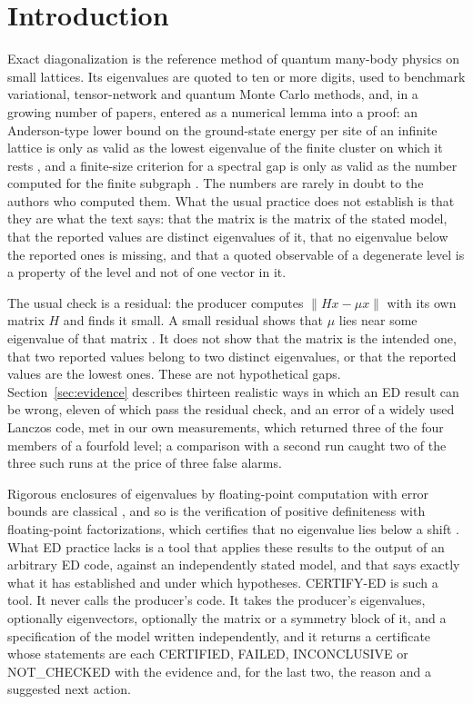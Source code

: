 \documentclass[11pt,a4paper]{article}
\newcommand{\status}[1]{\textsf{#1}}
\newcommand{\CERT}{\status{CERTIFIED}}
\newcommand{\FAIL}{\status{FAILED}}
\newcommand{\INC}{\status{INCONCLUSIVE}}
\newcommand{\NC}{\status{NOT\_CHECKED}}
\newcommand{\norm}[1]{\lVert #1\rVert}
\begin{document}
\tableofcontents

\section{Introduction}
\label{sec:intro}

Exact diagonalization is the reference method of quantum many-body physics on small lattices. Its eigenvalues are
quoted to ten or more digits, used to benchmark variational, tensor-network and quantum Monte Carlo methods, and, in a
growing number of papers, entered as a numerical lemma into a proof: an Anderson-type lower bound on the ground-state
energy per site of an infinite lattice is only as valid as the lowest eigenvalue of the finite cluster on which it
rests \cite{Anderson1951,KranitzPenc2026}, and a finite-size criterion for a spectral gap is only as valid as the
number computed for the finite subgraph \cite{Knabe1988,PomataWei2019}. The numbers are rarely in doubt to the authors
who computed them. What the usual practice does not establish is that they are what the text says: that the matrix is
the matrix of the stated model, that the reported values are distinct eigenvalues of it, that no eigenvalue below the
reported ones is missing, and that a quoted observable of a degenerate level is a property of the level and not of one
vector in it.

The usual check is a residual: the producer computes $\norm{Hx-\mu x}$ with its own matrix $H$ and finds it small. A
small residual shows that $\mu$ lies near some eigenvalue of that matrix \cite{Parlett1998}. It does not show that the
matrix is the intended one, that two reported values belong to two distinct eigenvalues, or that the reported values
are the lowest ones. These are not hypothetical gaps. Section~\ref{sec:evidence} describes thirteen realistic ways in
which an ED result can be wrong, eleven of which pass the residual check, and an error of a widely used Lanczos code,
met in our own measurements, which returned three of the four members of a fourfold level; a comparison with a second
run caught two of the three such runs at the price of three false alarms.

Rigorous enclosures of eigenvalues by floating-point computation with error bounds are classical
\cite{Kahan1967,Parlett1998,Higham2002,Rump2010}, and so is the verification of positive definiteness with
floating-point factorizations, which certifies that no eigenvalue lies below a shift \cite{Rump2006}. What ED practice lacks is a tool that applies these results to the output of an
arbitrary ED code, against an independently stated model, and that says exactly what it has established and under
which hypotheses. CERTIFY-ED is such a tool. It never calls the producer's code. It takes the producer's eigenvalues,
optionally eigenvectors, optionally the matrix or a symmetry block of it, and a specification of the model written
independently, and it returns a certificate whose statements are each \CERT, \FAIL, \INC{} or \NC{} with the evidence
and, for the last two, the reason and a suggested next action.
\end{document}
